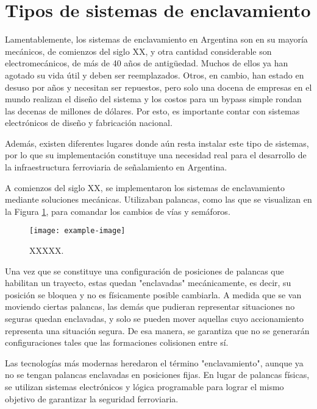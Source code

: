 \section{Tipos de sistemas de enclavamiento}

    Lamentablemente, los sistemas de enclavamiento en Argentina son en su mayoría mecánicos, de comienzos del siglo XX, y otra cantidad considerable son electromecánicos, de más de 40 años de antigüedad. Muchos de ellos ya han agotado su vida útil y deben ser reemplazados. Otros, en cambio, han estado en desuso por años y necesitan ser repuestos, pero solo una docena de empresas en el mundo realizan el diseño del sistema y los costos para un bypass simple rondan las decenas de millones de dólares. Por esto, es importante contar con sistemas electrónicos de diseño y fabricación nacional.
    
    Además, existen diferentes lugares donde aún resta instalar este tipo de sistemas, por lo que su implementación constituye una necesidad real para el desarrollo de la infraestructura ferroviaria de señalamiento en Argentina.
    
    A comienzos del siglo XX, se implementaron los sistemas de enclavamiento mediante soluciones mecánicas. Utilizaban palancas, como las que se visualizan en la Figura \ref{fig:enclavamiento_2}, para comandar los cambios de vías y semáforos.
    
        \begin{figure}[h]
            \centering
            \texttt{[image: example-image]}
            \centering\caption{XXXXX.}
            \label{fig:enclavamiento_2}
        \end{figure}
    
    Una vez que se constituye una configuración de posiciones de palancas que habilitan un trayecto, estas quedan "enclavadas" mecánicamente, es decir, su posición se bloquea y no es físicamente posible cambiarla. A medida que se van moviendo ciertas palancas, las demás que pudieran representar situaciones no seguras quedan enclavadas, y solo se pueden mover aquellas cuyo accionamiento representa una situación segura. De esa manera, se garantiza que no se generarán configuraciones tales que las formaciones colisionen entre sí.
    
    Las tecnologías más modernas heredaron el término "enclavamiento", aunque ya no se tengan palancas enclavadas en posiciones fijas. En lugar de palancas físicas, se utilizan sistemas electrónicos y lógica programable para lograr el mismo objetivo de garantizar la seguridad ferroviaria.
    
